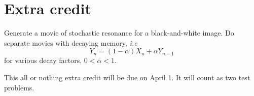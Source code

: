 \section*{Extra credit}

Generate a movie of stochastic resonance for a black-and-white image. Do separate movies with decaying memory, {\em i.e}
$$ Y_n = (1-\alpha) X_n + \alpha Y_{n-1}$$
for various decay factors, $0<\alpha<1$.

This all or nothing extra credit will be due on April 1. It will count as two test problems.
